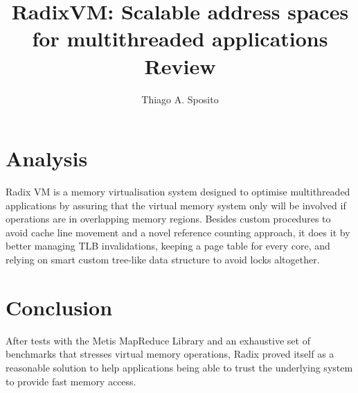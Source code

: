 \documentclass[12pt]{article}
\title{RadixVM: Scalable address spaces for multithreaded applications Review}
\author{Thiago A. Sposito\inst{1} }
\begin{document}
 

\maketitle

\section{Analysis}
Radix VM \cite{clements2013radixvm} is a memory virtualisation system designed to optimise multithreaded applications by assuring that the virtual memory system only will be involved if operations are in overlapping memory regions. Besides custom procedures to avoid cache line movement and a novel reference counting approach, it does it by better managing TLB invalidations, keeping a page table for every core, and relying on smart custom tree-like data structure to avoid locks altogether. 

\section{Conclusion}
After tests with the Metis MapReduce Library and an exhaustive set of benchmarks that stresses virtual memory operations, Radix proved itself as a reasonable solution to help applications being able to trust the underlying system to provide fast memory access.

\end{document}
